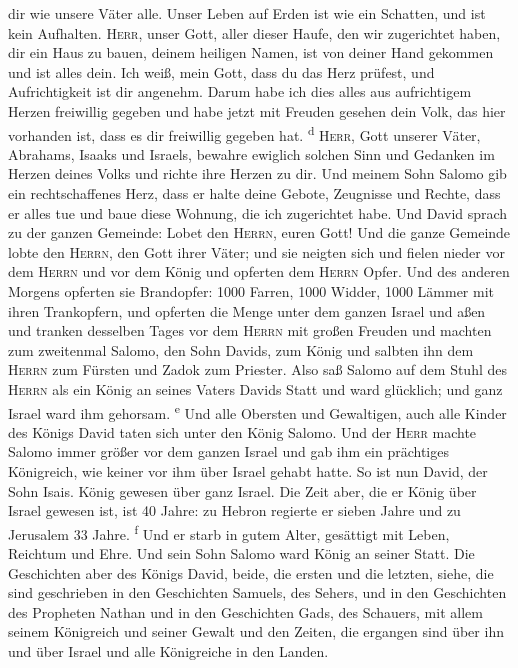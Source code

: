 dir wie unsere Väter alle. Unser Leben auf Erden ist wie ein Schatten,
und ist kein Aufhalten.  \textsc{Herr}, unser Gott, aller
dieser Haufe, den wir zugerichtet haben, dir ein Haus zu bauen, deinem
heiligen Namen, ist von deiner Hand gekommen und ist alles dein.
 Ich weiß, mein Gott, dass du das Herz prüfest, und
Aufrichtigkeit ist dir angenehm. Darum habe ich dies alles aus
aufrichtigem Herzen freiwillig gegeben und habe jetzt mit Freuden
gesehen dein Volk, das hier vorhanden ist, dass es dir freiwillig
gegeben hat. \textsuperscript{d}  \textsc{Herr}, Gott
unserer Väter, Abrahams, Isaaks und Israels, bewahre ewiglich solchen
Sinn und Gedanken im Herzen deines Volks und richte ihre Herzen zu dir.
 Und meinem Sohn Salomo gib ein rechtschaffenes Herz,
dass er halte deine Gebote, Zeugnisse und Rechte, dass er alles tue und
baue diese Wohnung, die ich zugerichtet habe.  Und David
sprach zu der ganzen Gemeinde: Lobet den \textsc{Herrn}, euren Gott! Und
die ganze Gemeinde lobte den \textsc{Herrn}, den Gott ihrer Väter; und
sie neigten sich und fielen nieder vor dem \textsc{Herrn} und vor dem
König  und opferten dem \textsc{Herrn} Opfer. Und des
anderen Morgens opferten sie Brandopfer: 1000 Farren, 1000 Widder, 1000
Lämmer mit ihren Trankopfern, und opferten die Menge unter dem ganzen
Israel  und aßen und tranken desselben Tages vor dem
\textsc{Herrn} mit großen Freuden und machten zum zweitenmal Salomo, den
Sohn Davids, zum König und salbten ihn dem \textsc{Herrn} zum Fürsten
und Zadok zum Priester.  Also saß Salomo auf dem Stuhl
des \textsc{Herrn} als ein König an seines Vaters Davids Statt und ward
glücklich; und ganz Israel ward ihm gehorsam. \textsuperscript{e}
 Und alle Obersten und Gewaltigen, auch alle Kinder des
Königs David taten sich unter den König Salomo.  Und der
\textsc{Herr} machte Salomo immer größer vor dem ganzen Israel und gab
ihm ein prächtiges Königreich, wie keiner vor ihm über Israel gehabt
hatte.  So ist nun David, der Sohn Isais. König gewesen
über ganz Israel.  Die Zeit aber, die er König über
Israel gewesen ist, ist 40 Jahre: zu Hebron regierte er sieben Jahre und
zu Jerusalem 33 Jahre. \textsuperscript{f}  Und er starb
in gutem Alter, gesättigt mit Leben, Reichtum und Ehre. Und sein Sohn
Salomo ward König an seiner Statt.  Die Geschichten aber
des Königs David, beide, die ersten und die letzten, siehe, die sind
geschrieben in den Geschichten Samuels, des Sehers, und in den
Geschichten des Propheten Nathan und in den Geschichten Gads, des
Schauers,  mit allem seinem Königreich und seiner Gewalt
und den Zeiten, die ergangen sind über ihn und über Israel und alle
Königreiche in den Landen.
